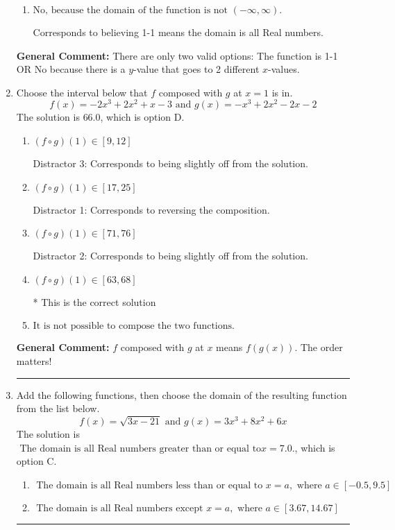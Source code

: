 \documentclass{extbook}[14pt]
\newcommand{\litem}[1]{\item #1

\rule{\textwidth}{0.4pt}}
\begin{document}
\begin{enumerate}
{\begin{enumerate}[label=\Alph*.]
Corresponds to the Horizontal Line test, which this function passes.
\item \( \text{No, because the domain of the function is not $(-\infty, \infty)$.} \)

Corresponds to believing 1-1 means the domain is all Real numbers.
\end{enumerate}

\textbf{General Comment:} There are only two valid options: The function is 1-1 OR No because there is a $y$-value that goes to 2 different $x$-values.
}
\litem{
Choose the interval below that $f$ composed with $g$ at $x=1$ is in.
\[ f(x) = -2x^{3} +2 x^{2} +x -3 \text{ and } g(x) = -x^{3} +2 x^{2} -2 x -2 \]The solution is \( 66.0 \), which is option D.\begin{enumerate}[label=\Alph*.]
\item \( (f \circ g)(1) \in [9, 12] \)

 Distractor 3: Corresponds to being slightly off from the solution.
\item \( (f \circ g)(1) \in [17, 25] \)

 Distractor 1: Corresponds to reversing the composition.
\item \( (f \circ g)(1) \in [71, 76] \)

 Distractor 2: Corresponds to being slightly off from the solution.
\item \( (f \circ g)(1) \in [63, 68] \)

* This is the correct solution
\item \( \text{It is not possible to compose the two functions.} \)


\end{enumerate}

\textbf{General Comment:} $f$ composed with $g$ at $x$ means $f(g(x))$. The order matters!
}
\litem{
Add the following functions, then choose the domain of the resulting function from the list below.
\[ f(x) = \sqrt{3x-21}  \text{ and } g(x) = 3x^{3} +8 x^{2} +6 x \]The solution is \( \text{ The domain is all Real numbers greater than or equal to} x = 7.0. \), which is option C.\begin{enumerate}[label=\Alph*.]
\item \( \text{ The domain is all Real numbers less than or equal to } x = a, \text{ where } a \in [-0.5, 9.5] \)


\item \( \text{ The domain is all Real numbers except } x = a, \text{ where } a \in [3.67, 14.67] \)



\end{enumerate}}
\end{enumerate}
\end{document}
